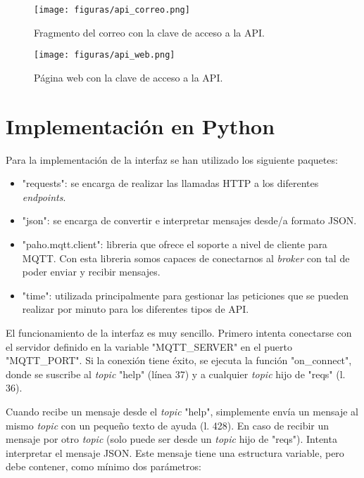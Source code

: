 \documentclass{scrbook}
\begin{document}
\begin{figure}[tbh] 
\begin{center}
\texttt{[image: figuras/api\_correo.png]}
\caption{Fragmento del correo con la clave de acceso a la API.} 
\label{fig:api_correo}
\end{center}
\end{figure}

\begin{figure}[tbh] 
\begin{center}
\texttt{[image: figuras/api\_web.png]}
\caption{Página web con la clave de acceso a la API.} 
\label{fig:api_web}
\end{center}
\end{figure}

\section{Implementación en Python}
Para la implementación de la interfaz se han utilizado los siguiente paquetes:

\begin{itemize}
    \item "requests": se encarga de realizar las llamadas HTTP a los diferentes \textit{endpoints}.
    \item "json": se encarga de convertir e interpretar mensajes desde/a formato JSON.
    \item "paho.mqtt.client": libreria que ofrece el soporte a nivel de cliente para MQTT. Con esta libreria somos capaces de conectarnos al \textit{broker} con tal de poder enviar y recibir mensajes.
    \item "time": utilizada principalmente para gestionar las peticiones que se pueden realizar por minuto para los diferentes tipos de API.
\end{itemize}

El funcionamiento de la interfaz es muy sencillo. Primero intenta conectarse con el servidor definido en la variable "MQTT\_SERVER" en el puerto "MQTT\_PORT". Si la conexión tiene éxito, se ejecuta la función "on\_connect", donde se suscribe al \textit{topic} "help" (línea 37) y a cualquier \textit{topic} hijo de "reqs" (l. 36).

Cuando recibe un mensaje desde el \textit{topic} "help", simplemente envía un mensaje al mismo \textit{topic} con un pequeño texto de ayuda (l. 428). En caso de recibir un mensaje por otro \textit{topic} (solo puede ser desde un \textit{topic} hijo de "reqs"). Intenta interpretar el mensaje JSON. Este mensaje tiene una estructura variable, pero debe contener, como mínimo dos parámetros:
\end{document}
